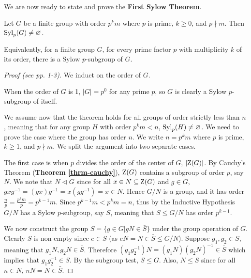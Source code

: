 We are now ready to state and prove the \textbf{First Sylow Theorem}.
\begin{theorem}[Sylow I]\label{thrm-sylow-1}
    Let $G$ be a finite group with order $p^k m$ where $p$ is prime, $k \geq 0$, and $p \nmid m$. Then $\mathrm{Syl}_{p}(G) \neq \varnothing$.
\end{theorem}
\begin{remark}
    Equivalently, for a finite group $G$, for every prime factor $p$ with multiplicity $k$ of its order, there is a Sylow $p$-subgroup of $G$.
\end{remark}
\begin{proof}[Proof (see \cite{mann_2011} pp. 1-3)]
    We induct on the order of $G$.

    When the order of $G$ is 1, $|G| = p^0$ for any prime $p$, so $G$ is clearly a Sylow $p$-subgroup of itself.

    We assume now that the theorem holds for all groups of order strictly less than $n$, meaning that for any group $H$ with order $p^k m < n$, $\mathrm{Syl}_{p}(H) \neq \varnothing$. We need to prove the case where the group has order $n$. We write $n = p^k m$ where $p$ is prime, $k \geq 1$, and $p \nmid m$. We split the argument into two separate cases.

    The first case is when $p$ divides the order of the center of $G$, $|\mathrm{Z}(G)|$. By Cauchy's Theorem (\textbf{Theorem \ref{thrm-cauchy}}), $\mathrm{Z}(G)$ contains a subgroup of order $p$, say $N$. We note that $N \lhd G$ since for all $x \in N \subseteq \mathrm{Z}(G)$ and $g \in G$, $gxg^{-1} = (gx)g^{-1} = x(gg^{-1}) = x \in N$. Hence $G/N$ is a group, and it has order $\frac np = \frac{p^km}{p} = p^{k-1}m$. Since $p^{k-1}m < p^km = n$, thus by the Inductive Hypothesis $G/N$ has a Sylow $p$-subgroup, say $\bar{S}$, meaning that $\bar{S} \leq G/N$ has order $p^{k-1}$.

    We now construct the group $S = \{g \in G \vert gN \in \bar{S}\}$ under the group operation of $G$. Clearly $S$ is non-empty since $e \in S$ (as $eN = N \in \bar{S} \leq G/N$). Suppose $g_1, g_2 \in S$, meaning that $g_1N, g_2N \in \bar{S}$. Therefore $(g_1g_2^{-1})N = (g_1N)(g_2N)^{-1} \in \bar{S}$ which implies that $g_1g_2^{-1} \in S$. By the subgroup test, $S \leq G$. Also, $N \leq S$ since for all $n \in N$, $nN = N \in \bar{S}$.


\end{proof}
